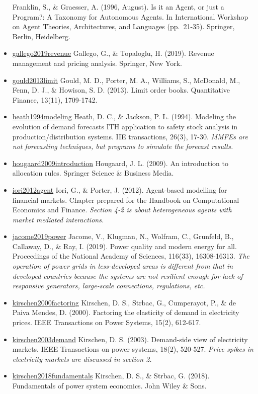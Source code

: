 \documentclass[letterpaper,8pt,twocolumn,twoside,]{pinp}
\begin{document}
\begin{itemize}
  Franklin, S., \& Graesser, A. (1996, August). Is it an Agent, or just
  a Program?: A Taxonomy for Autonomous Agents. In International
  Workshop on Agent Theories, Architectures, and Languages (pp.~21-35).
  Springer, Berlin, Heidelberg.
\item
  \href{https://link.springer.com/book/10.1007/978-1-4939-9606-3}{gallego2019revenue}
  Gallego, G., \& Topaloglu, H. (2019). Revenue management and pricing
  analysis. Springer, New York.
\item
  \href{https://www.tandfonline.com/doi/abs/10.1080/14697688.2013.803148}{gould2013limit}
  Gould, M. D., Porter, M. A., Williams, S., McDonald, M., Fenn, D. J.,
  \& Howison, S. D. (2013). Limit order books. Quantitative Finance,
  13(11), 1709-1742.
\item
  \href{https://www.tandfonline.com/doi/abs/10.1080/07408179408966604}{heath1994modeling}
  Heath, D. C., \& Jackson, P. L. (1994). Modeling the evolution of
  demand forecasts ITH application to safety stock analysis in
  production/distribution systems. IIE transactions, 26(3), 17-30.
  \emph{MMFEs are not forecasting techniques, but programs to simulate
  the forecast results.}
\item
  \href{https://link.springer.com/book/10.1007/978-3-642-01828-2}{hougaard2009introduction}
  Hougaard, J. L. (2009). An introduction to allocation rules. Springer
  Science \& Business Media.
\item
  \href{https://www.oxfordhandbooks.com/view/10.1093/oxfordhb/9780199844371.001.0001/oxfordhb-9780199844371-e-43}{iori2012agent}
  Iori, G., \& Porter, J. (2012). Agent-based modelling for financial
  markets. Chapter prepared for the Handbook on Computational Economics
  and Finance. \emph{Section 4-2 is about heterogeneous agents with
  market mediated interactions.}
\item
  \href{https://www.pnas.org/content/116/33/16308}{jacome2019power}
  Jacome, V., Klugman, N., Wolfram, C., Grunfeld, B., Callaway, D., \&
  Ray, I. (2019). Power quality and modern energy for all. Proceedings
  of the National Academy of Sciences, 116(33), 16308-16313. \emph{The
  operation of power grids in less-developed areas is different from
  that in developed countries because the systems are not resilient
  enough for lack of responsive generators, large-scale connections,
  regulations, etc.}
\item
  \href{https://ieeexplore.ieee.org/document/867149}{kirschen2000factoring}
  Kirschen, D. S., Strbac, G., Cumperayot, P., \& de Paiva Mendes, D.
  (2000). Factoring the elasticity of demand in electricity prices. IEEE
  Transactions on Power Systems, 15(2), 612-617.
\item
  \href{https://ieeexplore.ieee.org/document/1198281}{kirschen2003demand}
  Kirschen, D. S. (2003). Demand-side view of electricity markets. IEEE
  Transactions on power systems, 18(2), 520-527. \emph{Price spikes in
  electricity markets are discussed in section 2.}
\item
  \href{https://www.wiley.com/en-us/Fundamentals+of+Power+System+Economics\%2C+2nd+Edition-p-9781119213253}{kirschen2018fundamentals}
  Kirschen, D. S., \& Strbac, G. (2018). Fundamentals of power system
  economics. John Wiley \& Sons.


\end{itemize}
\end{document}
